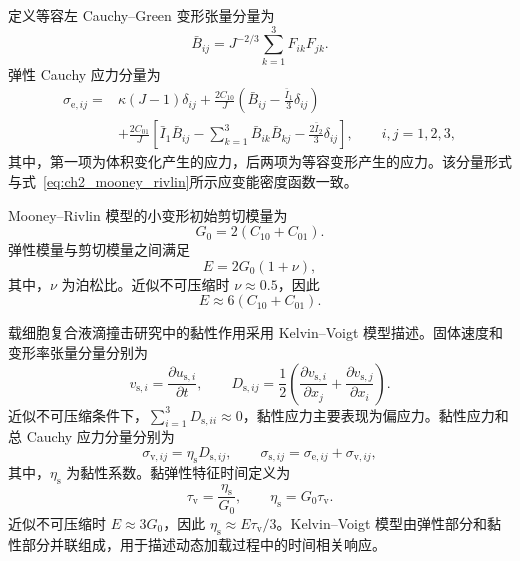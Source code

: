 定义等容左 Cauchy--Green 变形张量分量为
\begin{equation}
\bar B_{ij}
=
J^{-2/3}
\sum_{k=1}^{3}F_{ik}F_{jk}.
\label{eq:ch2_isochoric_left_cauchy_green}
\end{equation}
弹性 Cauchy 应力分量为
\begin{equation}
\begin{aligned}
\sigma_{\mathrm e,ij}
={}&
\kappa\left(J-1\right)\delta_{ij}
+
\frac{2C_{10}}{J}
\left(
\bar B_{ij}
-
\frac{\bar I_1}{3}\delta_{ij}
\right)
\\
&+
\frac{2C_{01}}{J}
\left[
\bar I_1\bar B_{ij}
-
\sum_{k=1}^{3}\bar B_{ik}\bar B_{kj}
-
\frac{2\bar I_2}{3}\delta_{ij}
\right],
\qquad i,j=1,2,3,
\end{aligned}
\label{eq:ch2_hyperelastic_stress}
\end{equation}
其中，第一项为体积变化产生的应力，后两项为等容变形产生的应力。该分量形式与式~\eqref{eq:ch2_mooney_rivlin}所示应变能密度函数一致。

Mooney--Rivlin 模型的小变形初始剪切模量为
\begin{equation}
G_0=2\left(C_{10}+C_{01}\right).
\label{eq:ch2_initial_shear_modulus}
\end{equation}
弹性模量与剪切模量之间满足
\begin{equation}
E=2G_0(1+\nu),
\label{eq:ch2_elastic_shear_relation}
\end{equation}
其中，$\nu$ 为泊松比。近似不可压缩时 $\nu\approx0.5$，因此
\begin{equation}
E\approx6\left(C_{10}+C_{01}\right).
\label{eq:ch2_mr_modulus_relation}
\end{equation}

载细胞复合液滴撞击研究中的黏性作用采用 Kelvin--Voigt 模型描述。固体速度和变形率张量分量分别为
\begin{equation}
v_{\mathrm s,i}
=
\frac{\partial u_{\mathrm s,i}}{\partial t},
\qquad
D_{\mathrm s,ij}
=
\frac{1}{2}
\left(
\frac{\partial v_{\mathrm s,i}}{\partial x_j}
+
\frac{\partial v_{\mathrm s,j}}{\partial x_i}
\right).
\label{eq:ch2_solid_rate}
\end{equation}
近似不可压缩条件下，$\sum_{i=1}^{3}D_{\mathrm s,ii}\approx0$，黏性应力主要表现为偏应力。黏性应力和总 Cauchy 应力分量分别为
\begin{equation}
\sigma_{\mathrm v,ij}
=
\eta_{\mathrm s}D_{\mathrm s,ij},
\qquad
\sigma_{\mathrm s,ij}
=
\sigma_{\mathrm e,ij}
+
\sigma_{\mathrm v,ij},
\label{eq:ch2_kelvin_voigt_3d}
\end{equation}
其中，$\eta_{\mathrm s}$ 为黏性系数。黏弹性特征时间定义为
\begin{equation}
\tau_{\mathrm v}
=
\frac{\eta_{\mathrm s}}{G_0},
\qquad
\eta_{\mathrm s}=G_0\tau_{\mathrm v}.
\label{eq:ch2_kelvin_voigt_time}
\end{equation}
近似不可压缩时 $E\approx3G_0$，因此 $\eta_{\mathrm s}\approx E\tau_{\mathrm v}/3$。Kelvin--Voigt 模型由弹性部分和黏性部分并联组成，用于描述动态加载过程中的时间相关响应\cite{christensen1982theory,lakes1998viscoelastic}。

